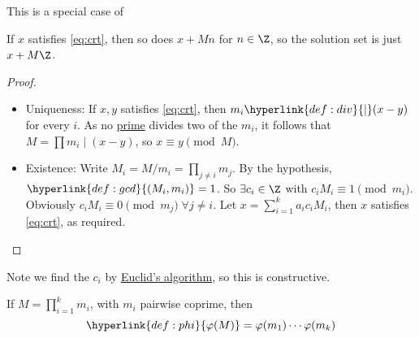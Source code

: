 \documentclass{article}
\begin{document}
This is a special case of


\begin{remark}
    If $x$ satisfies \eqref{eq:crt}, then so does $x+Mn$ for $n \in \Z$, so the solution set is just $x + M\Z$.
\end{remark}

\begin{proof}
    \leavevmode
    \begin{itemize}
        \item Uniqueness: If $x, y$ satisfies  \eqref{eq:crt}, then $m_i \hyperlink{def:div}{\mid} (x-y)$ for every $i$. As no \hyperlink{def:prime}{prime} divides two of the $m_i$, it follows that $M= \prod m_i \mid (x-y)$, so $x \equiv y \pmod{M}$.
        \item Existence: Write $M_i = M/m_i = \prod_{j\neq i} m_j$.
            By the hypothesis, $\hyperlink{def:gcd}{(M_i, m_i)} = 1$. So $ \exists c_i \in \Z$ with $c_i M _i \equiv 1 \pmod{m_i}$.
            Obviously $c_i M_i \equiv 0 \pmod{m_j}\; \forall j \neq i$. Let $x = \sum_{i=1}^k a_i c_i M_i$, then $x$ satisfies \eqref{eq:crt}, as required. \qedhere
    \end{itemize}
\end{proof}

Note we find the $c_i$ by \hyperlink{def:euclids}{Euclid's algorithm}, so this is constructive.

\begin{cor}
    If $M = \prod_{i=1}^k m_i$, with $m_i$ pairwise coprime, then
    \begin{equation*}
        \hyperlink{def:phi}{\varphi(M)} = \varphi(m_1) \dotsm \varphi (m_k)
    \end{equation*}
\end{cor}
\end{document}
